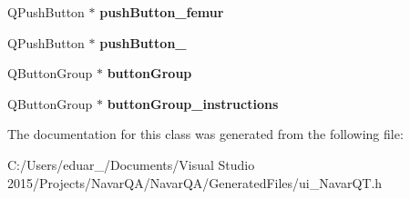 \begin{DoxyCompactItemize}
\item 
Q\+Push\+Button $\ast$ {\bfseries push\+Button\+\_\+femur}\hypertarget{class_ui___navar_q_t_class_ad1ded2d8d47fe15ecce2e78375a13d2a}{}\label{class_ui___navar_q_t_class_ad1ded2d8d47fe15ecce2e78375a13d2a}

\item 
Q\+Push\+Button $\ast$ {\bfseries push\+Button\+\_}\hypertarget{class_ui___navar_q_t_class_aece4b1454448a83de8dea2d36f89335e}{}\label{class_ui___navar_q_t_class_aece4b1454448a83de8dea2d36f89335e}

\item 
Q\+Button\+Group $\ast$ {\bfseries button\+Group}\hypertarget{class_ui___navar_q_t_class_abcfa95091f0e7432100eca5ac94eacdd}{}\label{class_ui___navar_q_t_class_abcfa95091f0e7432100eca5ac94eacdd}

\item 
Q\+Button\+Group $\ast$ {\bfseries button\+Group\+\_\+instructions}\hypertarget{class_ui___navar_q_t_class_abfb38653862570329854c1bc6af4b7c6}{}\label{class_ui___navar_q_t_class_abfb38653862570329854c1bc6af4b7c6}

\end{DoxyCompactItemize}


The documentation for this class was generated from the following file\+:\begin{DoxyCompactItemize}
\item 
C\+:/\+Users/eduar\+\_/\+Documents/\+Visual Studio 2015/\+Projects/\+Navar\+Q\+A/\+Navar\+Q\+A/\+Generated\+Files/ui\+\_\+\+Navar\+Q\+T.\+h\end{DoxyCompactItemize}

